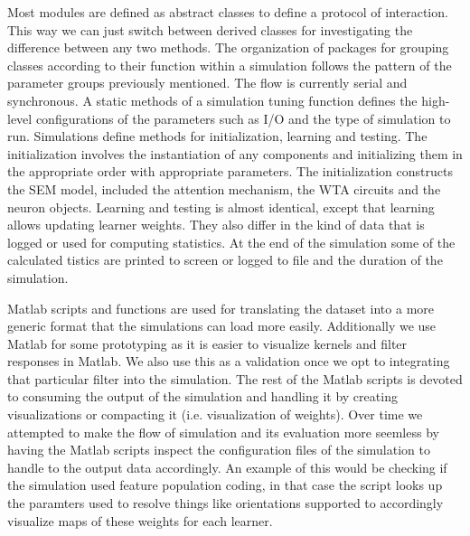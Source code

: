 \documentclass{report}
\begin{document}
Most modules are defined as abstract classes to define a protocol of interaction. This way we can just switch between derived classes for investigating the difference between any two methods.
The organization of packages for grouping classes according to their function within a simulation follows the pattern of the parameter groups previously mentioned.
The flow is currently serial and synchronous. A static methods of a simulation tuning function defines the high-level configurations of the parameters such as I/O and the type of simulation to run. Simulations define methods for initialization, learning and testing.
The initialization involves the instantiation of any components and initializing them in the appropriate order with appropriate parameters. The initialization constructs the SEM model, included the attention mechanism, the WTA circuits and the neuron objects.
Learning and testing is almost identical, except that learning allows updating learner weights. They also differ in the kind of data that is logged or used for computing statistics.
At the end of the simulation some of the calculated 
tistics are printed to screen or logged to file and the duration of the simulation.

Matlab scripts and functions are used for translating the dataset into a more generic format that the simulations can load more easily. Additionally we use Matlab for some prototyping as it is easier to visualize kernels and filter responses in Matlab. We also use this as a validation once we opt to integrating that particular filter into the simulation. The rest of the Matlab scripts is devoted to consuming the output of the simulation and handling it by creating visualizations or compacting it (i.e. visualization of weights). Over time we attempted to make the flow of simulation and its evaluation more seemless by having the Matlab scripts inspect the configuration files of the simulation to handle to the output data accordingly. An example of this would be checking if the simulation used feature population coding, in that case the script looks up the paramters used to resolve things like orientations supported to accordingly visualize maps of these weights for each learner.



\end{document}
